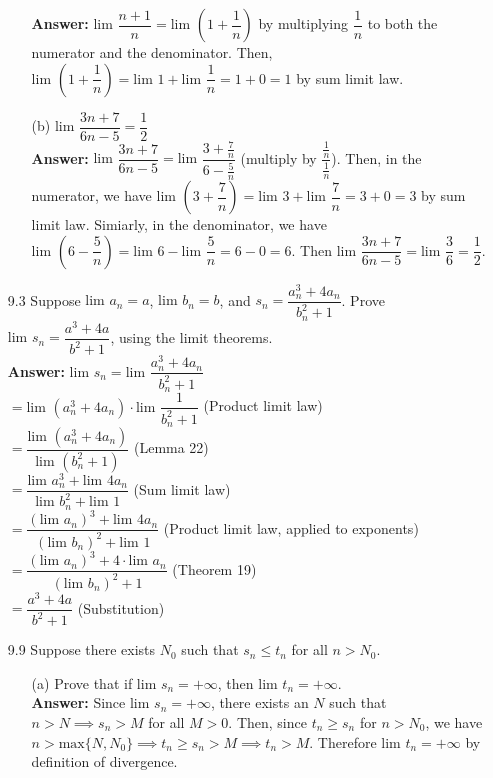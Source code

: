 \documentclass{article}
\begin{document}
\begin{itemize}
\begin{itemize}
                        \textbf{Answer: } $\text{lim }\dfrac{n+1}{n}=\text{lim }(1+\dfrac{1}{n})$ by multiplying $\dfrac{1}{n}$ to both the numerator and the denominator. Then, $\text{lim }(1+\dfrac{1}{n})=\text{lim }1+\text{lim }\dfrac{1}{n}=1+0=1$ by sum limit law.
                  \item [(b)] $\text{lim }\dfrac{3n+7}{6n-5}=\dfrac{1}{2}$\\
                        \textbf{Answer: } $\text{lim }\dfrac{3n+7}{6n-5}=\text{lim }\dfrac{3+\frac{7}{n}}{6-\frac{5}{n}}$ (multiply by $\dfrac{\frac{1}{n}}{\frac{1}{n}}$). Then, in the numerator, we have $\text{lim }(3+\dfrac{7}{n})=\text{lim }3+\text{lim }\dfrac{7}{n}=3+0=3$ by sum limit law. Simiarly, in the denominator, we have $\text{lim }(6-\dfrac{5}{n})=\text{lim }6-\text{lim }\dfrac{5}{n}=6-0=6$. Then $\text{lim }\dfrac{3n+7}{6n-5}=\text{lim }\dfrac{3}{6}=\dfrac{1}{2}$.
            \end{itemize}
      \item [9.3] Suppose $\text{lim }a_n=a$, $\text{lim }b_n=b$, and $s_n=\dfrac{a_n^3+4a_n}{b_n^2+1}$. Prove $\text{lim }s_n=\dfrac{a^3+4a}{b^2+1}$, using the limit theorems.\\
            \textbf{Answer: } $\text{lim }s_n=\text{lim }\dfrac{a_n^3+4a_n}{b_n^2+1}$\\$=\text{lim }(a_n^3+4a_n)\cdot\text{lim }\dfrac{1}{b_n^2+1}$ (Product limit law)\\$=\dfrac{\text{lim }(a_n^3+4a_n)}{\text{lim }(b_n^2+1)}$ (Lemma 22)\\$=\dfrac{\text{lim }a_n^3+\text{lim }4a_n}{\text{lim }b_n^2+\text{lim }1}$ (Sum limit law)\\$=\dfrac{(\text{lim }a_n)^3+\text{lim }4a_n}{(\text{lim }b_n)^2+\text{lim }1}$ (Product limit law, applied to exponents)\\$=\dfrac{(\text{lim }a_n)^3+4\cdot\text{lim }a_n}{(\text{lim }b_n)^2+1}$ (Theorem 19)\\$=\dfrac{a^3+4a}{b^2+1}$ (Substitution)
      \item [9.9] Suppose there exists $N_0$ such that $s_n\leq t_n$ for all $n>N_0$.
            \begin{itemize}
                  \item [(a)] Prove that if $\text{lim }s_n=+\infty$, then $\text{lim }t_n=+\infty$.\\
                        \textbf{Answer: } Since $\text{lim }s_n=+\infty$, there exists an $N$ such that $n>N\implies s_n>M$ for all $M>0$. Then, since $t_n\geq s_n$ for $n>N_0$, we have $n>\text{max}\{N,N_0\}\implies t_n\geq s_n>M\implies t_n>M$. Therefore $\text{lim }t_n=+\infty$ by definition of divergence.

\end{itemize}
\end{itemize}
\end{document}
